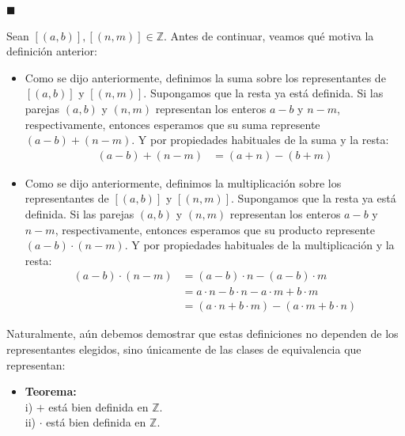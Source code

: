 \documentclass[10 pt]{article}
\begin{document}
\begin{flushright}
    $\blacksquare$
\end{flushright}

\Large{Sean $[(a,b)],[(n,m)] \in \mathbb Z$. Antes de continuar, veamos qué motiva la definición anterior:} \\

\begin{itemize}
    \item \Large{Como se dijo anteriormente, definimos la suma sobre los representantes de $[(a,b)]$ y $[(n,m)]$. Supongamos que la resta ya está definida. Si las parejas $(a,b)$ y $(n,m)$ representan los enteros $a-b$ y $n-m$, respectivamente, entonces esperamos que su suma represente $(a-b)+(n-m)$. Y por propiedades habituales de la suma y la resta:}
    \begin{align*}
        (a-b)+(n-m)&=(a+n)-(b+m)
    \end{align*}

    \item \Large{Como se dijo anteriormente, definimos la multiplicación sobre los representantes de $[(a,b)]$ y $[(n,m)]$. Supongamos que la resta ya está definida. Si las parejas $(a,b)$ y $(n,m)$ representan los enteros $a-b$ y $n-m$, respectivamente, entonces esperamos que su producto represente $(a-b) \cdot (n-m)$. Y por propiedades habituales de la multiplicación y la resta:}
    \begin{align*}
        (a-b) \cdot (n-m)&=(a-b) \cdot n-(a-b) \cdot m \\
    &=a \cdot n-b \cdot n-a \cdot m+b \cdot m \\
    &=(a \cdot n+b \cdot m)-(a \cdot m+b \cdot n)
    \end{align*}
\end{itemize}

\Large{Naturalmente, aún debemos demostrar que estas definiciones no dependen de los representantes elegidos, sino únicamente de las clases de equivalencia que representan:} \\

\begin{itemize}
    \item \Large{\textbf{Teorema:} \\

    i) $+$ está bien definida en $\mathbb Z$. \\

    ii) $\cdot$ está bien definida en $\mathbb Z$.} \\
\end{itemize}
\end{document}
